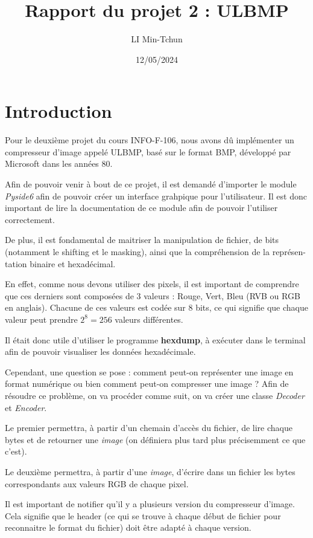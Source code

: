 \documentclass{report}
\title{Rapport du projet 2 : ULBMP}
\author{LI Min-Tchun}
\date{12/05/2024}
\begin{document}
	\maketitle
	\tableofcontents

\chapter{Introduction}
Pour le deuxième projet du cours INFO-F-106, nous avons dû implémenter un compresseur d'image appelé ULBMP, basé sur le format BMP, développé par Microsoft dans les années 80.

Afin de pouvoir venir à bout de ce projet, il est demandé d'importer le module \textit{Pyside6} afin de pouvoir créer un interface grahpique pour l'utilisateur. Il est donc important de lire la documentation de ce module afin de pouvoir l'utiliser correctement.

De plus, il est fondamental de maitriser la manipulation de fichier, de bits (notamment le shifting et le masking), ainsi que la compréhension de la représen-tation binaire et hexadécimal.

En effet, comme nous devons utiliser des pixels, il est important de comprendre que ces derniers sont composées de 3 valeurs : Rouge, Vert, Bleu (RVB ou RGB en anglais). Chacune de ces valeurs est codée sur 8 bits, ce qui signifie que chaque valeur peut prendre $2^8 = 256$ valeurs différentes.


Il était donc utile d'utiliser le programme \textbf{hexdump}, à exécuter dans le terminal afin de pouvoir visualiser les données hexadécimale.

Cependant, une question se pose : comment peut-on représenter une image en format numérique ou bien comment peut-on compresser une image ? Afin de résoudre ce problème, on va procéder comme suit, on va créer une classe \textit{Decoder} et \textit{Encoder}. 

Le premier permettra, à partir d'un chemain d'accès du fichier, de lire chaque bytes et de retourner une \textit{image} (on définiera plus tard plus précisemment ce que c'est).  

Le deuxième permettra, à partir d'une \textit{image}, d'écrire dans un fichier les bytes correspondants aux valeurs RGB de chaque pixel.

Il est important de notifier qu'il y a plusieurs version du compresseur d'image. Cela signifie que le header (ce qui se trouve à chaque début de fichier pour reconnaitre le format du fichier) doit être adapté à chaque version.
\end{document}
